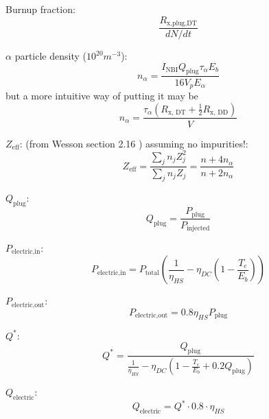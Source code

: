 Burnup fraction:
\begin{equation}
    \frac{R_{\text{x,plug,DT}}}{dN/dt}
\end{equation}

$\alpha$ particle density ($10^{20}m^{-3}$):
\begin{equation}
    n_{\alpha} = \frac{I_{\text{NBI}} Q_{\text{plug}} \tau_{\alpha} E_b}{16 V_p E_{\alpha}}
\end{equation} but a more intuitive way of putting it may be 
\begin{equation}
    n_{\alpha} = \frac{\tau_{\alpha} \left(R_{\text{x, DT}} + \frac{1}{2} R_{\text{x, DD}} \right)}{V}
\end{equation}

$Z_{\text{eff}}$: (from Wesson section 2.16 \cite{wesson_1987_419}) assuming no impurities!:
\begin{equation}
    Z_{\text{eff}} = \frac{\sum_j n_j Z_j^2}{\sum_j n_j Z_j} = \frac{n + 4 n_\alpha}{n + 2 n_\alpha}
\end{equation}

$Q_{\text{plug}}$:
\begin{equation}
    Q_{\text{plug}} = \frac{P_{\text{plug}}}{P_{\text{injected}}}
\end{equation}


$P_{\text{electric,in}}$:
\begin{equation}
    P_{\text{electric,in}} = P_{\text{total}}\left(\frac{1}{\eta_{HS}} - \eta_{DC}\left(1-\frac{T_e}{E_b}\right)\right)
\end{equation}

$P_{\text{electric,out}}$: 
\begin{equation}
    P_{\text{electric,out}} = 0.8\eta_{HS}P_{\text{plug}}
\end{equation}

$Q^{\ast}$: 
\begin{equation}
    Q^{\ast} = \frac{Q_{\text{plug}}}{\frac{1}{\eta_{HS}} - \eta_{DC}\left(1-\frac{T_e}{E_b}+0.2Q_{\text{plug}}\right)}
\end{equation}

$Q_{\text{electric}}$:
\begin{equation}
    Q_{\text{electric}} = Q^{\ast} \cdot 0.8 \cdot \eta_{HS}
\end{equation}


